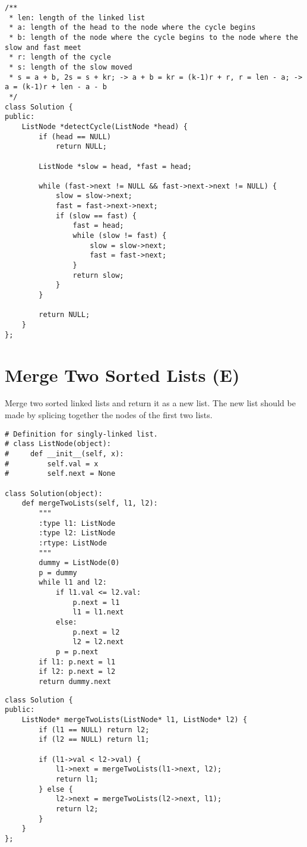 \begin{lstlisting}
/** 
 * len: length of the linked list
 * a: length of the head to the node where the cycle begins
 * b: length of the node where the cycle begins to the node where the slow and fast meet
 * r: length of the cycle
 * s: length of the slow moved
 * s = a + b, 2s = s + kr; -> a + b = kr = (k-1)r + r, r = len - a; -> a = (k-1)r + len - a - b
 */
class Solution {
public:
    ListNode *detectCycle(ListNode *head) {
        if (head == NULL)
            return NULL;

        ListNode *slow = head, *fast = head;
        
        while (fast->next != NULL && fast->next->next != NULL) {
            slow = slow->next;
            fast = fast->next->next;
            if (slow == fast) {
                fast = head;
                while (slow != fast) {
                    slow = slow->next;
                    fast = fast->next;
                }
                return slow;
            }
        }
        
        return NULL;
    }
};
\end{lstlisting}


\section{Merge Two Sorted Lists (E)}
Merge two sorted linked lists and return it as a new list. The new list should be made by splicing together the nodes of the first two lists.\\

\begin{lstlisting}
# Definition for singly-linked list.
# class ListNode(object):
#     def __init__(self, x):
#         self.val = x
#         self.next = None

class Solution(object):
    def mergeTwoLists(self, l1, l2):
        """
        :type l1: ListNode
        :type l2: ListNode
        :rtype: ListNode
        """
        dummy = ListNode(0)
        p = dummy
        while l1 and l2:
            if l1.val <= l2.val:
                p.next = l1
                l1 = l1.next
            else: 
                p.next = l2
                l2 = l2.next
            p = p.next
        if l1: p.next = l1
        if l2: p.next = l2
        return dummy.next
\end{lstlisting}
                
\begin{lstlisting}
class Solution {
public:
    ListNode* mergeTwoLists(ListNode* l1, ListNode* l2) {
        if (l1 == NULL) return l2;
        if (l2 == NULL) return l1;
        
        if (l1->val < l2->val) {
            l1->next = mergeTwoLists(l1->next, l2);
            return l1;
        } else {
            l2->next = mergeTwoLists(l2->next, l1);
            return l2;
        }
    }
};
\end{lstlisting}


